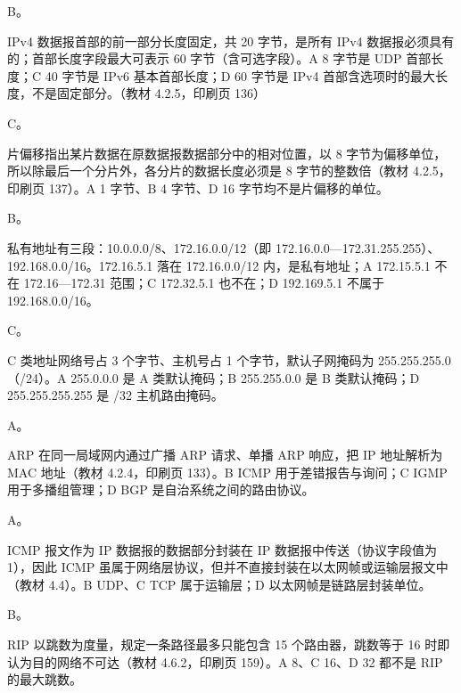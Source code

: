 \documentclass[a4paper,11pt]{article}
\begin{document}


\q B。\begin{analysis}IPv4 数据报首部的前一部分长度固定，共 20 字节，是所有 IPv4 数据报必须具有的；首部长度字段最大可表示 60 字节（含可选字段）。A 8 字节是 UDP 首部长度；C 40 字节是 IPv6 基本首部长度；D 60 字节是 IPv4 首部含选项时的最大长度，不是固定部分。（教材 4.2.5，印刷页 136）\end{analysis}

\q C。\begin{analysis}片偏移指出某片数据在原数据报数据部分中的相对位置，以 8 字节为偏移单位，所以除最后一个分片外，各分片的数据长度必须是 8 字节的整数倍（教材 4.2.5，印刷页 137）。A 1 字节、B 4 字节、D 16 字节均不是片偏移的单位。\end{analysis}

\q B。\begin{analysis}私有地址有三段：10.0.0.0/8、172.16.0.0/12（即 172.16.0.0—172.31.255.255）、192.168.0.0/16。172.16.5.1 落在 172.16.0.0/12 内，是私有地址；A 172.15.5.1 不在 172.16—172.31 范围；C 172.32.5.1 也不在；D 192.169.5.1 不属于 192.168.0.0/16。\end{analysis}

\q C。\begin{analysis}C 类地址网络号占 3 个字节、主机号占 1 个字节，默认子网掩码为 255.255.255.0（/24）。A 255.0.0.0 是 A 类默认掩码；B 255.255.0.0 是 B 类默认掩码；D 255.255.255.255 是 /32 主机路由掩码。\end{analysis}

\q A。\begin{analysis}ARP 在同一局域网内通过广播 ARP 请求、单播 ARP 响应，把 IP 地址解析为 MAC 地址（教材 4.2.4，印刷页 133）。B ICMP 用于差错报告与询问；C IGMP 用于多播组管理；D BGP 是自治系统之间的路由协议。\end{analysis}

\q A。\begin{analysis}ICMP 报文作为 IP 数据报的数据部分封装在 IP 数据报中传送（协议字段值为 1），因此 ICMP 虽属于网络层协议，但并不直接封装在以太网帧或运输层报文中（教材 4.4）。B UDP、C TCP 属于运输层；D 以太网帧是链路层封装单位。\end{analysis}

\q B。\begin{analysis}RIP 以跳数为度量，规定一条路径最多只能包含 15 个路由器，跳数等于 16 时即认为目的网络不可达（教材 4.6.2，印刷页 159）。A 8、C 16、D 32 都不是 RIP 的最大跳数。\end{analysis}
\end{document}

